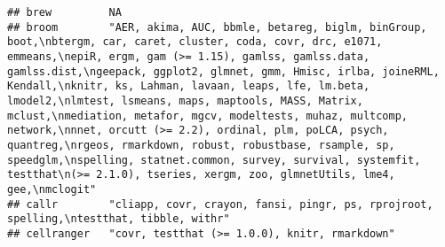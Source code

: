 \documentclass[]{book}
\begin{document}
\begin{verbatim}
## brew         NA                                                                                                                                                                                                                                                                                                                                                                                                                                                                                                                                                                                                                                                                                                        
## broom        "AER, akima, AUC, bbmle, betareg, biglm, binGroup, boot,\nbtergm, car, caret, cluster, coda, covr, drc, e1071, emmeans,\nepiR, ergm, gam (>= 1.15), gamlss, gamlss.data, gamlss.dist,\ngeepack, ggplot2, glmnet, gmm, Hmisc, irlba, joineRML, Kendall,\nknitr, ks, Lahman, lavaan, leaps, lfe, lm.beta, lmodel2,\nlmtest, lsmeans, maps, maptools, MASS, Matrix, mclust,\nmediation, metafor, mgcv, modeltests, muhaz, multcomp, network,\nnnet, orcutt (>= 2.2), ordinal, plm, poLCA, psych, quantreg,\nrgeos, rmarkdown, robust, robustbase, rsample, sp, speedglm,\nspelling, statnet.common, survey, survival, systemfit, testthat\n(>= 2.1.0), tseries, xergm, zoo, glmnetUtils, lme4, gee,\nmclogit"
## callr        "cliapp, covr, crayon, fansi, pingr, ps, rprojroot, spelling,\ntestthat, tibble, withr"                                                                                                                                                                                                                                                                                                                                                                                                                                                                                                                                                                                                                   
## cellranger   "covr, testthat (>= 1.0.0), knitr, rmarkdown"                                                                                                                                                                                                                                                                                                                                                                                                                                                                                                                                                                                                                                                             

\end{verbatim}
\end{document}
